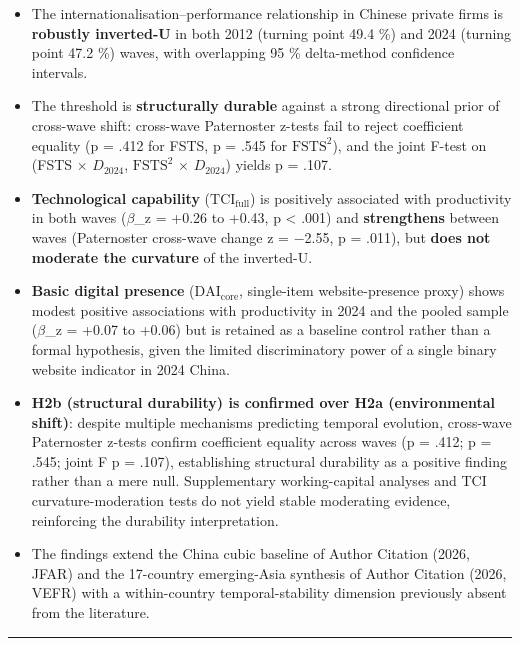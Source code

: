 \documentclass[12pt,a4paper]{article}
\begin{document}
\begin{itemize}
\item
  The internationalisation--performance relationship in Chinese private
  firms is \textbf{robustly inverted-U} in both 2012 (turning point 49.4
  \%) and 2024 (turning point 47.2 \%) waves, with overlapping 95 \%
  delta-method confidence intervals.
\item
  The threshold is \textbf{structurally durable} against a strong
  directional prior of cross-wave shift: cross-wave Paternoster z-tests
  fail to reject coefficient equality (p = .412 for FSTS, p = .545 for
  \(\mathrm{FSTS}^2\)), and the joint F-test on (FSTS \(\times\)
  \(D_{2024}\), \(\mathrm{FSTS}^2\) \(\times\) \(D_{2024}\)) yields p =
  .107.
\item
  \textbf{Technological capability} (\(\mathrm{TCI}_{\text{full}}\)) is
  positively associated with productivity in both waves (\(\beta\)\_z =
  +0.26 to +0.43, p \textless{} .001) and \textbf{strengthens} between
  waves (Paternoster cross-wave change z = −2.55, p = .011), but
  \textbf{does not moderate the curvature} of the inverted-U.
\item
  \textbf{Basic digital presence} (\(\mathrm{DAI}_{\text{core}}\),
  single-item website-presence proxy) shows modest positive associations
  with productivity in 2024 and the pooled sample (\(\beta\)\_z = +0.07
  to +0.06) but is retained as a baseline control rather than a formal
  hypothesis, given the limited discriminatory power of a single binary
  website indicator in 2024 China.
\item
  \textbf{H2b (structural durability) is confirmed over H2a
  (environmental shift)}: despite multiple mechanisms predicting
  temporal evolution, cross-wave Paternoster z-tests confirm coefficient
  equality across waves (p = .412; p = .545; joint F p = .107),
  establishing structural durability as a positive finding rather than a
  mere null. Supplementary working-capital analyses and TCI
  curvature-moderation tests do not yield stable moderating evidence,
  reinforcing the durability interpretation.
\item
  The findings extend the China cubic baseline of Author Citation (2026,
  JFAR) and the 17-country emerging-Asia synthesis of Author Citation
  (2026, VEFR) with a within-country temporal-stability dimension
  previously absent from the literature.
\end{itemize}

\begin{center}\rule{0.5\linewidth}{0.5pt}\end{center}
\end{document}
